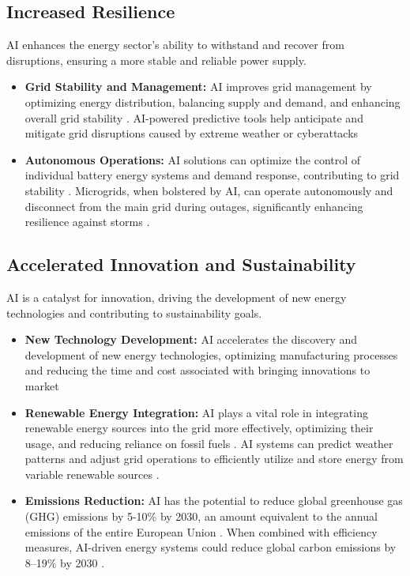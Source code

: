 \subsection{Increased Resilience}
AI enhances the energy sector's ability to withstand and recover from disruptions, ensuring a more stable and reliable power supply.
\begin{itemize}
    \item \textbf{Grid Stability and Management:} AI improves grid management by optimizing energy distribution, balancing supply and demand, and enhancing overall grid stability \cite{ATLTranslate_AI_Energy}. AI-powered predictive tools help anticipate and mitigate grid disruptions caused by extreme weather or cyberattacks \cite{EnergyGov_AI_Energy_Initial}
    \item \textbf{Autonomous Operations:} AI solutions can optimize the control of individual battery energy systems and demand response, contributing to grid stability \cite{MicrogridKnowledge_AI}. Microgrids, when bolstered by AI, can operate autonomously and disconnect from the main grid during outages, significantly enhancing resilience against storms \cite{NACleanEnergy_AI}.
\end{itemize}

\subsection{Accelerated Innovation and Sustainability}
AI is a catalyst for innovation, driving the development of new energy technologies and contributing to sustainability goals.
\begin{itemize}
    \item \textbf{New Technology Development:} AI accelerates the discovery and development of new energy technologies, optimizing manufacturing processes and reducing the time and cost associated with bringing innovations to market \cite{EnergyGov_AI_Energy_Initial}
    \item \textbf{Renewable Energy Integration:} AI plays a vital role in integrating renewable energy sources into the grid more effectively, optimizing their usage, and reducing reliance on fossil fuels \cite{ATLTranslate_AI_Energy}. AI systems can predict weather patterns and adjust grid operations to efficiently utilize and store energy from variable renewable sources \cite{InfinitiResearch_AI_Energy}.
    \item \textbf{Emissions Reduction:} AI has the potential to reduce global greenhouse gas (GHG) emissions by 5-10\% by 2030, an amount equivalent to the annual emissions of the entire European Union \cite{WEF_AI_Energy_2023}. When combined with efficiency measures, AI-driven energy systems could reduce global carbon emissions by 8--19\% by 2030 \cite{AInvest_Chevron}.
\end{itemize}

